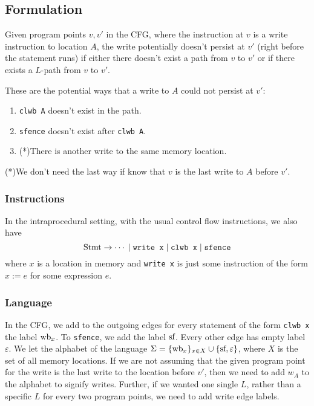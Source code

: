 \documentclass[11pt]{article}
\begin{document}
\subsection{Formulation}
Given program points $v,v'$ in the CFG, where the instruction at $v$ is a write instruction to location $A$, the write potentially doesn't persist at $v'$ (right before the statement runs) if either there doesn't exist a path from $v$ to $v'$ or if there exists a $L$-path from $v$ to $v'$.

These are the potential ways that a write to $A$ could not persist at $v'$:
\begin{enumerate}
    \item \texttt{clwb A} doesn't exist in the path.
    
    \item \texttt{sfence} doesn't exist after \texttt{clwb A}.
    
    \item (*)There is another write to the same memory location.
\end{enumerate}
(*)We don't need the last way if know that $v$ is the last write to $A$ before $v'$.

\subsubsection{Instructions}
In the intraprocedural setting, with the usual control flow instructions, we also have
\[\textnormal{Stmt} \rightarrow \cdots \;\vert\; \texttt{write x} \;\vert\; \texttt{clwb x} \;\vert\; \texttt{sfence}\]
where $x$ is a location in memory and \texttt{write x} is just some instruction of the form $x := e$ for some expression $e$.

\subsubsection{Language}
In the CFG, we add to the outgoing edges for every statement of the form \texttt{clwb x} the label $\textnormal{wb}_{x}$. To \texttt{sfence}, we add the label $\textnormal{sf}$. Every other edge has empty label $\varepsilon$. We let the alphabet of the language $\Sigma = \{\textnormal{wb}_x\}_{x\in X} \cup \{\textnormal{sf}, \varepsilon\}$, where $X$ is the set of all memory locations. If we are not assuming that the given program point for the write is the last write to the location before $v'$, then we need to add $w_A$ to the alphabet to signify writes. Further, if we wanted one single $L$, rather than a specific $L$ for every two program points, we need to add write edge labels.
\end{document}

